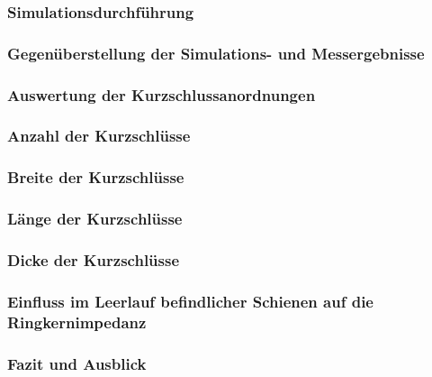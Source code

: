 \documentclass[accentcolor=tud9b, colorbacktitle, inverttitle]{tudbeamer}
\begin{document}
\begin{frame}\frametitle{Simulationsdurchf\"uhrung}

\end{frame}



\begin{frame}\frametitle{Gegen\"uberstellung der Simulations- und Messergebnisse}

\end{frame}



\begin{frame}\frametitle{Auswertung der Kurzschlussanordnungen}

\end{frame}



\begin{frame}\frametitle{Anzahl der Kurzschl\"usse}

\end{frame}



\begin{frame}\frametitle{Breite der Kurzschlüsse}

\end{frame}


\begin{frame}\frametitle{Länge der Kurzschlüsse}

\end{frame}


\begin{frame}\frametitle{Dicke der Kurzschlüsse}

\end{frame}




\begin{frame}\frametitle{Einfluss im Leerlauf befindlicher Schienen auf die Ringkernimpedanz}

\end{frame}



\begin{frame}\frametitle{Fazit und Ausblick}

\end{frame}

% 	 
\end{document}
